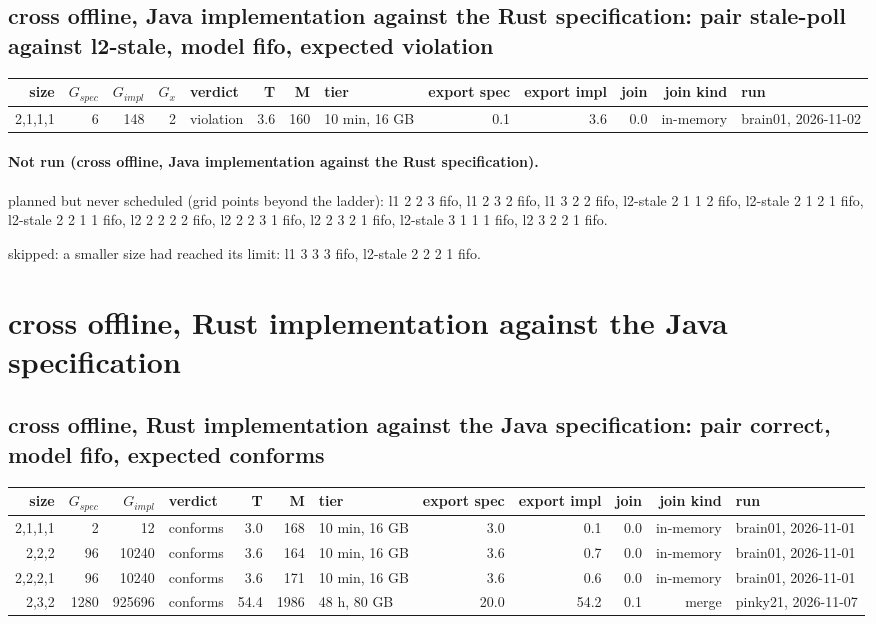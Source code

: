 \documentclass[10pt]{article}
\begin{document}
\subsection*{cross offline, Java implementation against the Rust specification: pair \textsf{stale-poll} against \textsf{l2-stale}, model fifo, expected violation}
\begin{longtable}{@{}rrrrlrrlrrrrl@{}}
\toprule
size & $G_{\mathit{spec}}$ & $G_{\mathit{impl}}$ & $G_x$ & verdict & T & M & tier & export spec & export impl & join & join kind & run \\
\midrule
\endhead
\color{red} 2,1,1,1 & 6 & 148 & 2 & violation & 3.6 & 160 & 10 min, 16 GB & 0.1 & 3.6 & 0.0 & in-memory & brain01, 2026-11-02 \\
\bottomrule
\end{longtable}
\paragraph{Not run (cross offline, Java implementation against the Rust specification).}
planned but never scheduled (grid points beyond the ladder): l1 2 2 3 fifo, l1 2 3 2 fifo, l1 3 2 2 fifo, l2-stale 2 1 1 2 fifo, l2-stale 2 1 2 1 fifo, l2-stale 2 2 1 1 fifo, l2 2 2 2 2 fifo, l2 2 2 3 1 fifo, l2 2 3 2 1 fifo, l2-stale 3 1 1 1 fifo, l2 3 2 2 1 fifo.\par
skipped: a smaller size had reached its limit: l1 3 3 3 fifo, l2-stale 2 2 2 1 fifo.\par
\section*{cross offline, Rust implementation against the Java specification}
\subsection*{cross offline, Rust implementation against the Java specification: pair \textsf{correct}, model fifo, expected conforms}
\begin{longtable}{@{}rrrlrrlrrrrl@{}}
\toprule
size & $G_{\mathit{spec}}$ & $G_{\mathit{impl}}$ & verdict & T & M & tier & export spec & export impl & join & join kind & run \\
\midrule
\endhead
\color{red} 2,1,1,1 & 2 & 12 & conforms & 3.0 & 168 & 10 min, 16 GB & 3.0 & 0.1 & 0.0 & in-memory & brain01, 2026-11-01 \\
\color{red} 2,2,2 & 96 & 10240 & conforms & 3.6 & 164 & 10 min, 16 GB & 3.6 & 0.7 & 0.0 & in-memory & brain01, 2026-11-01 \\
\color{red} 2,2,2,1 & 96 & 10240 & conforms & 3.6 & 171 & 10 min, 16 GB & 3.6 & 0.6 & 0.0 & in-memory & brain01, 2026-11-01 \\
\color{red} 2,3,2 & 1280 & 925696 & conforms & 54.4 & 1986 & 48 h, 80 GB & 20.0 & 54.2 & 0.1 & merge & pinky21, 2026-11-07 \\
\bottomrule
\end{longtable}
\end{document}
